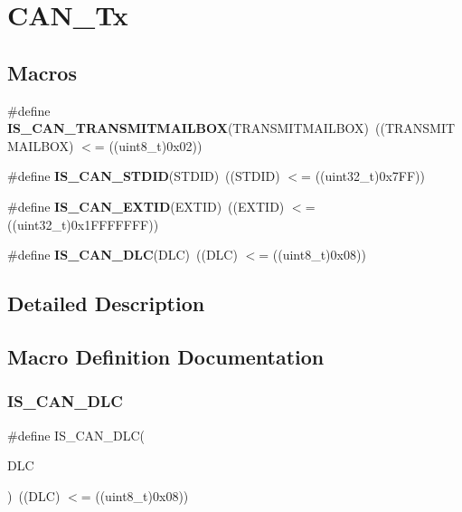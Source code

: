 \section{C\+A\+N\+\_\+\+Tx}
\label{group__CAN__Tx}
\subsection*{Macros}
\begin{DoxyCompactItemize}
\item 
\#define \textbf{ I\+S\+\_\+\+C\+A\+N\+\_\+\+T\+R\+A\+N\+S\+M\+I\+T\+M\+A\+I\+L\+B\+OX}(T\+R\+A\+N\+S\+M\+I\+T\+M\+A\+I\+L\+B\+OX)~((T\+R\+A\+N\+S\+M\+I\+T\+M\+A\+I\+L\+B\+OX) $<$= ((uint8\+\_\+t)0x02))
\item 
\#define \textbf{ I\+S\+\_\+\+C\+A\+N\+\_\+\+S\+T\+D\+ID}(S\+T\+D\+ID)~((S\+T\+D\+ID) $<$= ((uint32\+\_\+t)0x7\+F\+F))
\item 
\#define \textbf{ I\+S\+\_\+\+C\+A\+N\+\_\+\+E\+X\+T\+ID}(E\+X\+T\+ID)~((E\+X\+T\+ID) $<$= ((uint32\+\_\+t)0x1\+F\+F\+F\+F\+F\+F\+F))
\item 
\#define \textbf{ I\+S\+\_\+\+C\+A\+N\+\_\+\+D\+LC}(D\+LC)~((D\+LC) $<$= ((uint8\+\_\+t)0x08))
\end{DoxyCompactItemize}


\subsection{Detailed Description}


\subsection{Macro Definition Documentation}
\mbox{\label{group__CAN__Tx_ga6109469a6a2792b3e7c6be520ea50d36}} 
\subsubsection{I\+S\+\_\+\+C\+A\+N\+\_\+\+D\+LC}
{\footnotesize\ttfamily \#define I\+S\+\_\+\+C\+A\+N\+\_\+\+D\+LC(\begin{DoxyParamCaption}\item[{}]{D\+LC }\end{DoxyParamCaption})~((D\+LC) $<$= ((uint8\+\_\+t)0x08))}



